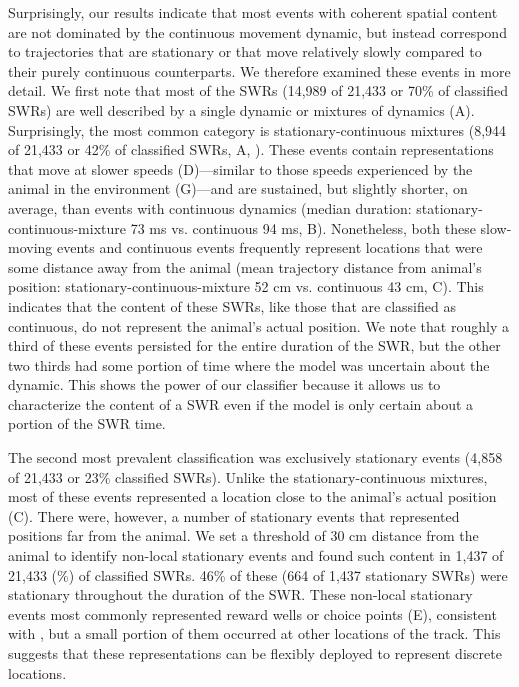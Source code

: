\documentclass[9pt,lineno]{elife}
\begin{document}
Surprisingly, our results indicate that most events with coherent spatial content are not dominated by the continuous movement dynamic, but instead correspond to trajectories that are stationary or that move relatively slowly compared to their purely continuous counterparts. We therefore examined these events in more detail. We first note that most of the SWRs (14,989 of 21,433 or 70\% of classified SWRs) are well described by a single dynamic or mixtures of dynamics (A). Surprisingly, the most common category is stationary-continuous mixtures (8,944 of 21,433 or 42\% of classified SWRs, A, ). These events contain representations that move at slower speeds (D)---similar to those speeds experienced by the animal in the environment (G)---and are sustained, but slightly shorter, on average, than events with continuous dynamics (median duration: stationary-continuous-mixture 73 ms vs. continuous 94 ms, B). Nonetheless, both these slow-moving events and continuous events frequently represent locations that were some distance away from the animal (mean trajectory distance from animal's position: stationary-continuous-mixture 52 cm vs. continuous 43 cm, C). This indicates that the content of these SWRs, like those that are classified as continuous, do not represent the animal's actual position. We note that roughly a third of these events persisted for the entire duration of the SWR, but the other two thirds had some portion of time where the model was uncertain about the dynamic. This shows the power of our classifier because it allows us to characterize the content of a SWR even if the model is only certain about a portion of the SWR time.

The second most prevalent classification was exclusively stationary events (4,858 of 21,433 or 23\% classified SWRs). Unlike the stationary-continuous mixtures, most of these events represented a location close to the animal's actual position (C). There were, however, a number of stationary events that represented positions far from the animal. We set a threshold of 30 cm distance from the animal to identify non-local stationary events and found such content in 1,437 of 21,433 (\%) of classified SWRs. 46\% of these (664 of 1,437 stationary SWRs) were stationary throughout the duration of the SWR. These non-local stationary events most commonly represented reward wells or choice points (E), consistent with \citep{YuDistincthippocampalcorticalmemory2017}, but a small portion of them occurred at other locations of the track. This suggests that these representations can be flexibly deployed to represent discrete locations.
\end{document}
